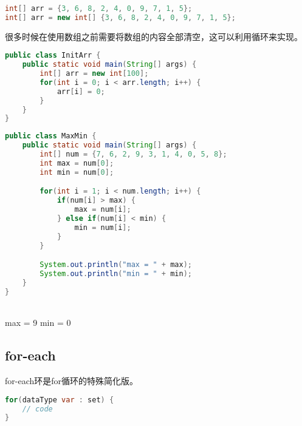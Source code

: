 \vspace{-0.5cm}

\begin{lstlisting}[language=Java]
int[] arr = {3, 6, 8, 2, 4, 0, 9, 7, 1, 5};
int[] arr = new int[] {3, 6, 8, 2, 4, 0, 9, 7, 1, 5};
\end{lstlisting}

很多时候在使用数组之前需要将数组的内容全部清空，这可以利用循环来实现。 \\


\begin{lstlisting}[language=Java]
public class InitArr {
    public static void main(String[] args) {
        int[] arr = new int[100];
        for(int i = 0; i < arr.length; i++) {
            arr[i] = 0;
        }
    }
}
\end{lstlisting}

\vspace{0.5cm}


\begin{lstlisting}[language=Java]
public class MaxMin {
    public static void main(String[] args) {
        int[] num = {7, 6, 2, 9, 3, 1, 4, 0, 5, 8};
        int max = num[0];
        int min = num[0];

        for(int i = 1; i < num.length; i++) {
            if(num[i] > max) {
                max = num[i];
            } else if(num[i] < min) {
                min = num[i];
            }
        }

        System.out.println("max = " + max);
        System.out.println("min = " + min);
    }
}
\end{lstlisting}

\begin{tcolorbox}
	 \\
	max = 9
	min = 0
\end{tcolorbox}

\subsection{for-each}

for-each环是for循环的特殊简化版。

\vspace{-0.5cm}

\begin{lstlisting}[language=Java]
for(dataType var : set) {
    // code
}
\end{lstlisting}

